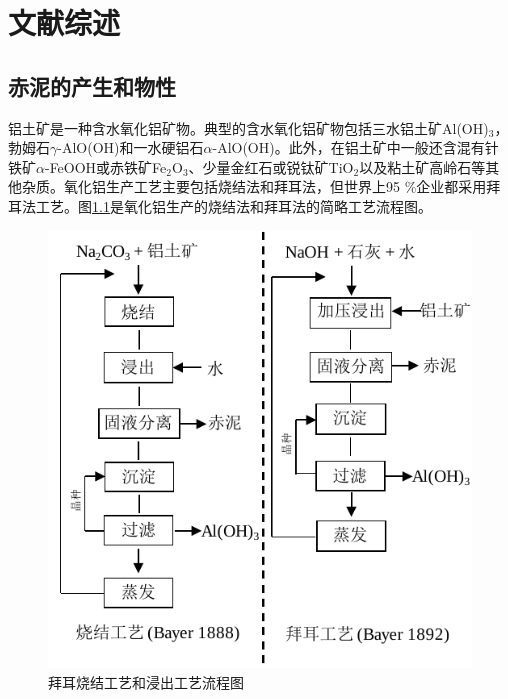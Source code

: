 \chapter{文献综述}
\section{赤泥的产生和物性}
铝土矿是一种含水氧化铝矿物。典型的含水氧化铝矿物包括三水铝土矿Al(OH)$ _{\mathrm{3}} $，勃姆石$ \gamma $-AlO(OH)和一水硬铝石$\alpha$-AlO(OH)。此外，在铝土矿中一般还含混有针铁矿$\alpha$-FeOOH或赤铁矿Fe$ _{\mathrm{2}} $O$ _{\mathrm{3}} $、少量金红石或锐钛矿TiO$ _{\mathrm{2}} $以及粘土矿高岭石等其他杂质。氧化铝生产工艺主要包括烧结法和拜耳法，但世界上95 \%企业都采用拜耳法工艺\cite{klauber2011bauxite}。图\ref{bayerandsinteringprocess}是氧化铝生产的烧结法和拜耳法的简略工艺流程图。
\begin{figure}[!h]
	\centering
	\vspace{5pt}
	\includegraphics[width=0.65\linewidth]{Figures/c1/bayerandsinteringprocess}
	\caption{拜耳烧结工艺和浸出工艺流程图}\label{bayerandsinteringprocess}
\end{figure}

